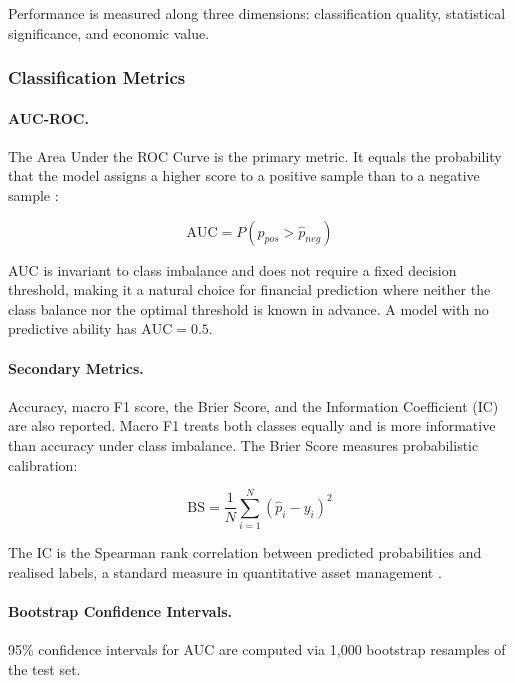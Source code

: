 Performance is measured along three dimensions: classification quality, statistical significance, and economic value.

\subsubsection{Classification Metrics}

\paragraph{AUC-ROC.}
The Area Under the ROC Curve is the primary metric. It equals the probability that the model assigns a higher score to a positive sample than to a negative sample \parencite{delong1988}:

\begin{equation}
\text{AUC} = P\!\left(\hat{p}_{pos} > \hat{p}_{neg}\right)
\label{eq:auc}
\end{equation}

AUC is invariant to class imbalance and does not require a fixed decision threshold, making it a natural choice for financial prediction where neither the class balance nor the optimal threshold is known in advance. A model with no predictive ability has $\text{AUC} = 0.5$.

\paragraph{Secondary Metrics.}
Accuracy, macro F1 score, the Brier Score, and the Information Coefficient (IC) are also reported. Macro F1 treats both classes equally and is more informative than accuracy under class imbalance. The Brier Score measures probabilistic calibration:

\begin{equation}
\text{BS} = \frac{1}{N} \sum_{i=1}^{N} \left(\hat{p}_i - y_i\right)^2
\label{eq:brier}
\end{equation}

The IC is the Spearman rank correlation between predicted probabilities and realised labels, a standard measure in quantitative asset management \parencite{Gu2020}.

\paragraph{Bootstrap Confidence Intervals.}
95\% confidence intervals for AUC are computed via 1,000 bootstrap resamples of the test set.

